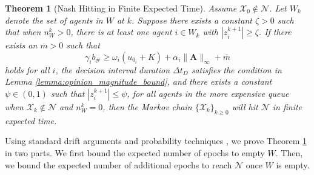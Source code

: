 \documentclass[conference]{IEEEtran}
\newtheorem{theorem}{Theorem}
\begin{document}
\begin{theorem}[Nash Hitting in Finite Expected Time]\label{thm:finite_hit_time}
    Assume $\mathcal{X}_0 \notin \mathcal{N}$. Let $W_k$ denote the set of agents in $W$ at $k$. Suppose there exists a constant $\zeta > 0$ such that when $n^k_W > 0$, there is at least one agent $i \in W_k$ with $|z^{k+1}_i| \ge \zeta$.
    If there exists an $\overline{m} > 0$ such that 
    \begin{equation}\label{eqn:suff_input_condition}
        \gamma_i b_{\#} \ge \omega_i(u_{0_i} + K) + \alpha_i\|\boldsymbol{A}\|_{\infty} + \overline{m}
    \end{equation}
    holds for all $i$, the decision interval duration $\Delta t_D$ satisfies the condition in Lemma \ref{lemma:opinion_magnitude_bound}, and there exists a constant $\psi \in (0,1)$ such that $|z^{k+1}_i| \leq \psi$, for all agents in the more expensive queue when $\mathcal{X}_k \notin \mathcal{N}$ and $n^k_W = 0$, 
    then the Markov chain $\{\mathcal{X}_k\}_{k \ge 0}$ will hit $\mathcal{N}$ in finite expected time.
\end{theorem}
Using standard drift arguments \cite{meyn2012markov} and probability techniques \cite{williams1991probability}, we prove Theorem \ref{thm:finite_hit_time} in two parts. We first bound the expected number of epochs to empty $W$. Then, we bound the expected number of additional epochs to reach $\mathcal{N}$ once $W$ is empty.  
\end{document}
